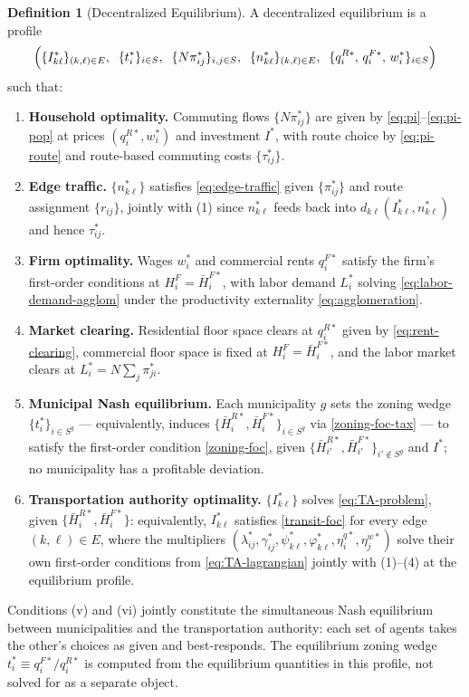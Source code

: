 \documentclass[12pt, a4paper]{article}
\theoremstyle{definition}
\newtheorem{definition}{Definition}
\theoremstyle{remark}
\begin{document}
\begin{definition}[Decentralized Equilibrium]
A decentralized equilibrium is a profile
\[
\Bigl(
\{I_{k\ell}^*\}_{(k,\ell) \in E},\;\;
\{t_i^{*}\}_{i \in S},\;\;
\{N\pi_{ij}^*\}_{i,j \in S},\;\;
\{n_{k\ell}^*\}_{(k,\ell) \in E},\;\;
\{q_i^{R*},\,q_i^{F*},\,w_i^*\}_{i \in S}
\Bigr)
\]
such that:
\begin{enumerate}
    \item \textbf{Household optimality.} Commuting flows $\{N\pi_{ij}^*\}$ are given by \eqref{eq:pi}--\eqref{eq:pi-pop} at prices $(q_i^{R*}, w_i^*)$ and investment $I^*$, with route choice by \eqref{eq:pi-route} and route-based commuting costs $\{\tau_{ij}^*\}$.
    \item \textbf{Edge traffic.} $\{n_{k\ell}^*\}$ satisfies \eqref{eq:edge-traffic} given $\{\pi_{ij}^*\}$ and route assignment $\{r_{ij}\}$, jointly with (1) since $n_{k\ell}^*$ feeds back into $d_{k\ell}(I_{k\ell}^*,n_{k\ell}^*)$ and hence $\tau_{ij}^*$.
    \item \textbf{Firm optimality.} Wages $w_i^*$ and commercial rents $q_i^{F*}$ satisfy the firm's first-order conditions at $H_i^F = \bar{H}_i^{F*}$, with labor demand $L_i^*$ solving \eqref{eq:labor-demand-agglom} under the productivity externality \eqref{eq:agglomeration}.
    \item \textbf{Market clearing.} Residential floor space clears at $q_i^{R*}$ given by \eqref{eq:rent-clearing}, commercial floor space is fixed at $H_i^F = \bar{H}_i^{F*}$, and the labor market clears at $L_i^* = N\sum_j \pi_{ji}^*$.
    \item \textbf{Municipal Nash equilibrium.} Each municipality $g$ sets the zoning wedge $\{t_i^{*}\}_{i \in S^g}$ — equivalently, induces $\{\bar{H}_i^{R*}, \bar{H}_i^{F*}\}_{i \in S^g}$ via \eqref{zoning-foc-tax} — to satisfy the first-order condition \eqref{zoning-foc}, given $\{\bar{H}_{i'}^{R*}, \bar{H}_{i'}^{F*}\}_{i' \notin S^g}$ and $I^*$; no municipality has a profitable deviation.
    \item \textbf{Transportation authority optimality.} $\{I_{k\ell}^*\}$ solves \eqref{eq:TA-problem}, given $\{\bar{H}_i^{R*}, \bar{H}_i^{F*}\}$: equivalently, $I_{k\ell}^*$ satisfies \eqref{transit-foc} for every edge $(k,\ell)\in E$, where the multipliers $(\lambda_{ij}^*,\gamma_{ij}^*,\psi_{k\ell}^*,\varphi_{k\ell}^*,\eta_i^{q*},\eta_j^{w*})$ solve their own first-order conditions from \eqref{eq:TA-lagrangian} jointly with (1)--(4) at the equilibrium profile.
\end{enumerate}
Conditions (v) and (vi) jointly constitute the simultaneous Nash equilibrium between municipalities and the transportation authority: each set of agents takes the other's choices as given and best-responds. The equilibrium zoning wedge $t_i^{*} \equiv q_i^{F*}/q_i^{R*}$ is computed from the equilibrium quantities in this profile, not solved for as a separate object.
\end{definition}
\end{document}
